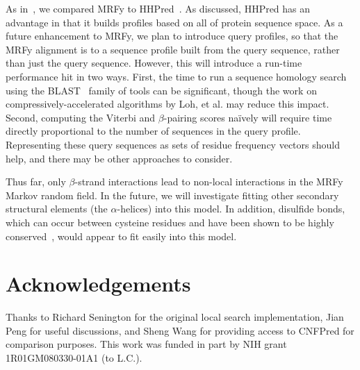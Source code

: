 \documentclass{acm_proc_article-sp}
\begin{document}
As in~\cite{Daniels:2012dg}, we compared MRFy to 
HHPred~\cite{Soding:2005ff}.
As discussed, HHPred has an advantage in that it builds profiles based on all
of protein sequence space.
As a future enhancement to MRFy, we plan to introduce query profiles, so that
the MRFy alignment is to a sequence profile built from the query sequence,
rather than just the query sequence.
However, this will introduce a run-time performance hit in two ways.
First, the time to run a sequence homology search using the BLAST~\cite{Altschul:1997tl} 
family of tools can be significant, though the work on 
compressively-accelerated algorithms by Loh, et al.\cite{Loh:2012br} may reduce this 
impact.
Second, computing the Viterbi and $\beta$-pairing scores na\"{i}vely will
require time directly proportional to the number of sequences in the query
profile.
Representing these query sequences as sets of residue frequency vectors should
help, and there may be other approaches to consider.

Thus far, only $\beta$-strand interactions lead to non-local interactions in the
MRFy Markov random field.
In the future, we will investigate fitting other secondary structural elements
(the $\alpha$-helices) into this model.
In addition, disulfide bonds, which can occur between cysteine residues and
have been shown to be highly conserved~\cite{Naamati:2009eg, Tirosh:2012iq}, 
would appear to fit easily into this model.

\section{Acknowledgements}
Thanks to Richard Senington for the original local search implementation, Jian
Peng for useful discussions, and
Sheng Wang for providing access to CNFPred for comparison purposes.
This work was funded in part by NIH grant 1R01GM080330-01A1 (to L.C.).



{\small 

  }
\end{document}

